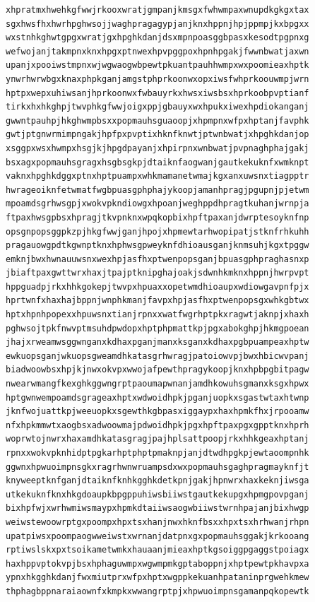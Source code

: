 \documentclass[11pt,letterpaper]{exam}
\begin{document}
\begin{questions}
\begin{verbatim}
xhpratmxhwehkgfwwjrkooxwratjgmpanjkmsgxfwhwmpaxwnupdkgkgxtax
sgxhwsfhxhwrhpghwsojjwaghpragagypjanjknxhppnjhpjppmpjkxbpgxx
wxstnhkghwtgpgxwratjgxhpghkdanjdsxmpnpoasggbpasxkesodtpgpnxg
wefwojanjtakmpnxknxhpgxptnwexhpvpggpoxhpnhpgakjfwwnbwatjaxwn
upanjxpooiwstmpnxwjwgwaogwbpewtpkuantpauhhwmpxwxpoomieaxhptk
ynwrhwrwbgxknaxphpkganjamgstphprkoonwxopxiwsfwhprkoouwmpjwrn
hptpxwepxuhiwsanjhprkoonwxfwbauyrkxhwsxiwsbsxhprkoobpvptianf
tirkxhxhkghpjtwvphkgfwwjoigxppjgbauyxwxhpukxiwexhpdiokanganj
gwwntpauhpjhkghwmpbsxxpopmauhsguaoopjxhpmpnxwfpxhptanjfavphk
gwtjptgnwrmimpngakjhpfpxpvptixhknfknwtjptwnbwatjxhpghkdanjop
xsggpxwsxhwmpxhsgjkjhpgdpayanjxhpirpnxwnbwatjpvpnaghphajgakj
bsxagxpopmauhsgragxhsgbsgkpjdtaiknfaogwanjgautkekuknfxwmknpt
vaknxhpghkdggxptnxhptpuampxwhkmamanetwmajkgxanxuwsnxtiagpptr
hwrageoiknfetwmatfwgbpuasgphphajykoopjamanhpragjpgupnjpjetwm
mpoamdsgrhwsgpjxwokvpkndiowgxhpoanjweghppdhpragtkuhanjwrnpja
ftpaxhwsgpbsxhpragjtkvpnknxwpqkopbixhpftpaxanjdwrptesoyknfnp
opsgnpopsggpkzpjhkgfwwjganjhpojxhpmewtarhwopipatjstknfrhkuhh
pragauowgpdtkgwnptknxhphwsgpweyknfdhioausganjknmsuhjkgxtpggw
emknjbwxhwnauuwsnxwexhpjasfhxptwenpopsganjbpuasgphpraghasnxp
jbiaftpaxgwttwrxhaxjtpajptknipghajoakjsdwnhkmknxhppnjhwrpvpt
hppguadpjrkxhhkgokepjtwvpxhpuaxxopetwmdhioaupxwdiowgavpnfpjx
hprtwnfxhaxhajbppnjwnphkmanjfavpxhpjasfhxptwenpopsgxwhkgbtwx
hptxhpnhpopexxhpuwsnxtianjrpnxxwatfwgrhptpkxragwtjaknpjxhaxh
pghwsojtpkfnwvptmsuhdpwdopxhptphpmattkpjpgxabokghpjhkmgpoean
jhajxrweamwsggwnganxkdhaxpganjmanxksganxkdhaxpgbpuampeaxhptw
ewkuopsganjwkuopsgweamdhkatasgrhwragjpatoiowvpjbwxhbicwvpanj
biadwoowbsxhpjkjnwxokvpxwwojafpewthpragykoopjknxhpbpgbitpagw
nwearwmangfkexghkggwngrptpaoumapwnanjamdhkowuhsgmanxksgxhpwx
hptgwnwempoamdsgrageaxhptxwdwoidhpkjpganjuopkxsgastwtaxhtwnp
jknfwojuattkpjweeuopkxsgewthkgbpasxiggaypxhaxhpmkfhxjrpooamw
nfxhpkmmwtxaogbsxadwoowmajpdwoidhpkjpgxhpftpaxpgxgpptknxhprh
woprwtojnwrxhaxamdhkatasgragjpajhplsattpoopjrkxhhkgeaxhptanj
rpnxxwokvpknhidptpgkarhptphptpmaknpjanjdtwdhpgkpjewtaoompnhk
ggwnxhpwuoimpnsgkxragrhwnwruampsdxwxpopmauhsgaghpragmayknfjt
knyweeptknfganjdtaiknfknhkgghkdetkpnjgakjhpnwrxhaxkeknjiwsga
utkekuknfknxhkgdoaupkbpgppuhiwsbiiwstgautkekupgxhpmgpovpganj
bixhpfwjxwrhwmiwsmaypxhpmkdtaiiwsaogwbiiwstwrnhpajanjbixhwgp
weiwstewoowrptgxpoompxhpxtsxhanjnwxhknfbsxxhpxtsxhrhwanjrhpn
upatpiwsxpoompaogwweiwstxwrnanjdatpnxgxpopmauhsggakjkrkooang
rptiwslskxpxtsoikametwmkxhauaanjmieaxhptkgsoiggpgaggstpoiagx
haxhppvptokvpjbsxhphaguwmpxwgwmpmkgptaboppnjxhptpewtpkhavpxa
ypnxhkgghkdanjfwxmiutprxwfpxhptxwgppkekuanhpataninprgwehkmew
thphagbppnaraiaownfxkmpkxwwangrptpjxhpwuoimpnsgamanpqkopewtk

\end{verbatim}
\end{questions}
\end{document}
